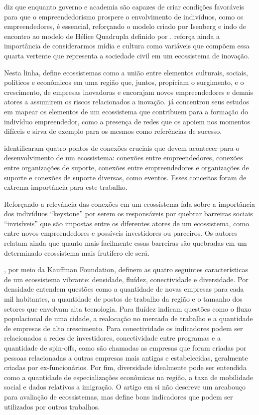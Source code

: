  diz que enquanto governo e academia são capazes de criar condições favoráveis para que o empreendedorismo prospere o envolvimento de indivíduos, como os empreendedores, é essencial, reforçando o modelo criado por Isenberg e indo de encontro ao modelo de Hélice Quadrupla definido por .  reforça ainda a importância de considerarmos mídia e cultura como variáveis que compõem essa quarta vertente que representa a sociedade civil em um ecossistema de inovação.

Nesta linha,  define ecossistemas como a união entre elementos culturais, sociais, políticos e econômicos em uma região que, juntos, propíciam o surgimento, e o crescimento, de empresas inovadoras e encorajam novos empreendedores e demais atores a assumirem os riscos relacionados a inovação.  já concentrou seus estudos em mapear os elementos de um ecossistema que contribuem para a formação do indivíduo empreendedor, como a presença de redes que os apoiem nos momentos difíceis e sirva de exemplo para os mesmos como referências de sucesso. 

 identificaram quatro pontos de conexões cruciais que devem acontecer para o desenvolvimento de um ecossistema: conexões entre empreendedores, conexões entre organizações de suporte, conexões entre empreendedores e organizações de suporte e conexões de suporte diversas, como eventos. Esses conceitos foram de extrema importância para este trabalho.

Reforçando a relevância das conexões em um ecossistema  fala sobre a importância dos indivíduos ``keystone'' por serem os responsáveis por quebrar barreiras sociais ``invisíveis'' que são impostas entre os diferentes atores de um ecossistema, como entre novos empreendedores e possíveis investidores ou parceiros. Os autores relatam ainda que quanto mais facilmente essas barreiras são quebradas em um determinado ecossistema mais frutífero ele será.

, por meio da Kauffman Foundation, definem as quatro seguintes características de um ecossistema vibrante: densidade, fluídez, conectividade e diversidade. Por densidade entendem questões como a quantidade de novas empresas para cada mil habitantes, a quantidade de postos de trabalho da região e o tamanho dos setores que envolvam alta tecnologia. Para fluídez indicam questões como o fluxo populacional de uma cidade, a realocação no mercado de trabalho e a quantidade de empresas de alto crescimento. Para conectividade os indicadores podem ser relacionados a redes de investidores, conectividade entre programas e a quantidade de spin-offs, como são chamadas as empresas que foram criadas por pessoas relacionadas a outras empresas mais antigas e estabelecidas, geralmente criadas por ex-funcionários. Por fim, diversidade idealmente pode ser entendida como a quantidade de especializações econômicas na região, a taxa de mobilidade social e dados relativos a imigração. O artigo em si não descreve um arcabouço para avaliação de ecossistemas, mas define bons indicadores que podem ser utilizados por outros trabalhos.

